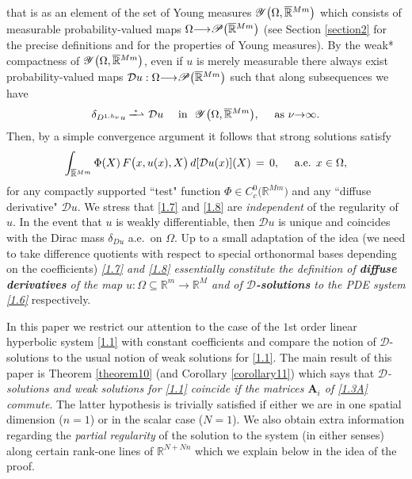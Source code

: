 \documentclass{amsart}
\theoremstyle{definition}
\numberwithin{equation}{section}
\begin{document}
that is as an element of the set of Young measures ${\mathscr{Y}}\big( {\Omega}, \smash{\overline{\mathbb{R}}}^{Mm} \big)$ which consists of measurable probability-valued maps ${\Omega} {\longrightarrow} \mathscr{P}\big( \smash{\overline{\mathbb{R}}}^{Mm} \big)$ (see Section \ref{section2} for the precise definitions and for the properties of Young measures). By the weak* compactness of ${\mathscr{Y}}\big( {\Omega}, \smash{\overline{\mathbb{R}}}^{Mm} \big)$, even if $u$ is merely measurable there always exist probability-valued maps ${\mathcal{D}} u : {\Omega} {\longrightarrow} \mathscr{P}\big( \smash{\overline{\mathbb{R}}}^{Mm} \big)$ such that along subsequences we have
\begin{equation}  \label{1.7}
{\delta}_{D^{1,h_\nu}u} \, \overset{^*}{\smash{-\!\!\!\!-\!\!\!\!\rightharpoonup}}\, \, {\mathcal{D}} u \quad \text{ in }\ {\mathscr{Y}}\big( {\Omega}, \smash{\overline{\mathbb{R}}}^{Mm} \big), \ \ \ \text{ as }\nu {\rightarrow} \infty.
\end{equation}
Then, by a simple convergence argument it follows that strong solutions satisfy
\begin{equation}  \label{1.8}
\int_{\smash{\overline{\mathbb{R}}}^{Mm}} \Phi(X)\, F\big( x,u(x),X\big)\, d[{\mathcal{D}} u(x)](X)\, =\, 0, \quad \text{ a.e. }x\in {\Omega},
\end{equation}
 for any compactly supported ``test" function $\Phi \in C^0_c\big( {\mathbb{R}}^{Mm} \big)$ and any ``diffuse derivative" ${\mathcal{D}} u$. We stress that \eqref{1.7} and \eqref{1.8} are \emph{independent} of the regularity of $u$. In the event that $u$ is weakly differentiable, then ${\mathcal{D}} u$ is unique and coincides with the Dirac mass ${\delta}_{Du}$ a.e.\ on ${\Omega}$. Up to a small adaptation of the idea (we need to take difference quotients with respect to special orthonormal bases depending on the coefficients) \emph{\eqref{1.7} and \eqref{1.8} essentially constitute the definition of \textbf{diffuse derivatives} of the map $u : {\Omega} {\subseteq} {\mathbb{R}}^m {\longrightarrow} {\mathbb{R}}^M$ and of \textbf{${\mathcal{D}}$-solutions} to the PDE system \eqref{1.6}} respectively.

In this paper we restrict our attention to the case of the $1$st order linear hyperbolic system \eqref{1.1} with constant coefficients and compare the notion of ${\mathcal{D}}$-solutions to the usual notion of weak solutions for \eqref{1.1}. The main result of this paper is Theorem \ref{theorem10} (and Corollary \ref{corollary11}) which says that \emph{${\mathcal{D}}$-solutions and weak solutions for \eqref{1.1} coincide if the matrices ${\textbf{A}}_i$ of \eqref{1.3A} commute}. The latter hypothesis is trivially satisfied if either we are in one spatial dimension ($n=1$) or in the scalar case  ($N=1$). We also obtain extra information regarding the \emph{partial regularity} of the solution to the system (in either senses) along certain rank-one lines of ${\mathbb{R}}^{N+Nn}$ which we explain below in the idea of the proof.
\end{document}
